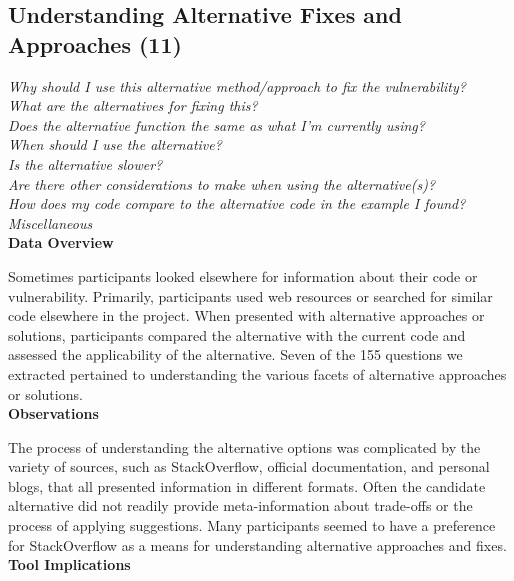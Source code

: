 \documentclass[conference]{IEEEtran}
\begin{document}

\noindent\subsection{\textbf{Understanding Alternative Fixes and Approaches (11)}}\label{uafa}

\noindent\emph{Why should I use this alternative method/approach to fix the vulnerability?} \\
\emph{What are the alternatives for fixing this?} \\
\emph{Does the alternative function the same as what I'm currently using?} \\
\emph{When should I use the alternative?} \\
\emph{Is the alternative slower?} \\
\emph{Are there other considerations to make when using the alternative(s)?} \\
\emph{How does my code compare to the alternative code in the example I found?} \\
\emph{Miscellaneous} \\


\noindent\textbf{Data Overview}

Sometimes participants looked elsewhere for information about their code or vulnerability. 
Primarily, participants used web resources or searched for similar code elsewhere in the project.
When presented with alternative approaches or solutions, participants compared the alternative with the current code and assessed the applicability of the alternative. 
Seven of the 155 questions we extracted pertained to understanding the various facets of alternative approaches or solutions.
\\

\noindent\textbf{Observations}

The process of understanding the alternative options was complicated by the variety of sources, such as StackOverflow, official documentation, and personal blogs, that all presented information in different formats.  
Often the candidate alternative did not readily provide meta-information about trade-offs or the process of applying suggestions. 
Many participants seemed to have a preference for StackOverflow as a means for understanding alternative approaches and fixes. 
\\

\noindent\textbf{Tool Implications}
\end{document}
